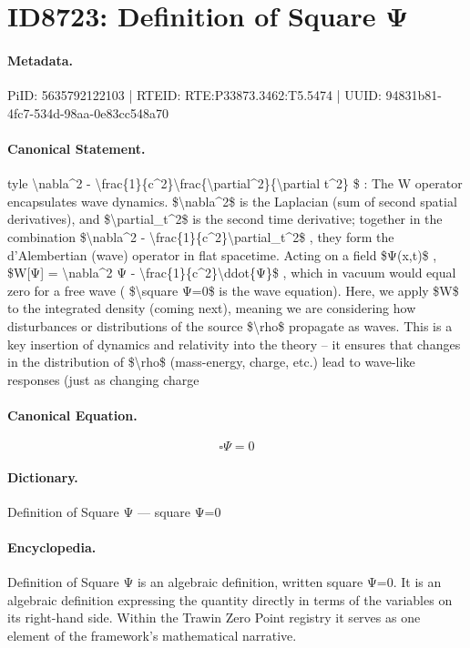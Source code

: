 \section*{ID8723: Definition of Square Ψ}
\paragraph{Metadata.}
PiID: 5635792122103 | RTEID: RTE:P33873.3462:T5.5474 | UUID: 94831b81-4fc7-534d-98aa-0e83cc548a70

\paragraph{Canonical Statement.}
tyle \textbackslash{}nabla\textasciicircum{}2 - \textbackslash{}frac\{1\}\{c\textasciicircum{}2\}\textbackslash{}frac\{\textbackslash{}partial\textasciicircum{}2\}\{\textbackslash{}partial t\textasciicircum{}2\} \$ : The W operator encapsulates wave dynamics. \$\textbackslash{}nabla\textasciicircum{}2\$ is the Laplacian (sum of second spatial derivatives), and \$\textbackslash{}partial\_t\textasciicircum{}2\$ is the second time derivative; together in the combination \$\textbackslash{}nabla\textasciicircum{}2 - \textbackslash{}frac\{1\}\{c\textasciicircum{}2\}\textbackslash{}partial\_t\textasciicircum{}2\$ , they form the d’Alembertian (wave) operator in flat spacetime. Acting on a field \$Ψ(x,t)\$ , \$W[Ψ] = \textbackslash{}nabla\textasciicircum{}2 Ψ - \textbackslash{}frac\{1\}\{c\textasciicircum{}2\}\textbackslash{}ddot\{Ψ\}\$ , which in vacuum would equal zero for a free wave ( \$\textbackslash{}square Ψ=0\$ is the wave equation). Here, we apply \$W\$ to the integrated density (coming next), meaning we are considering how disturbances or distributions of the source \$\textbackslash{}rho\$ propagate as waves. This is a key insertion of dynamics and relativity into the theory – it ensures that changes in the distribution of \$\textbackslash{}rho\$ (mass-energy, charge, etc.) lead to wave-like responses (just as changing charge

\paragraph{Canonical Equation.}
\[
\square Ψ=0
\]

\paragraph{Dictionary.}
Definition of Square Ψ — square Ψ=0

\paragraph{Encyclopedia.}
Definition of Square Ψ is an algebraic definition, written square Ψ=0. It is an algebraic definition expressing the quantity directly in terms of the variables on its right-hand side. Within the Trawin Zero Point registry it serves as one element of the framework's mathematical narrative.
